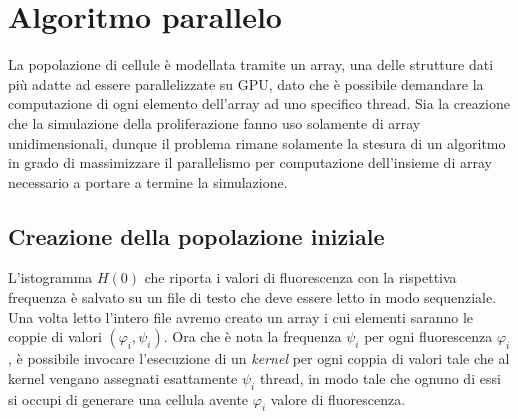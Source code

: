 \section{Algoritmo parallelo}

La popolazione di cellule è modellata tramite un array, una delle strutture
dati più adatte ad essere parallelizzate su GPU, dato che è possibile
demandare la computazione di ogni elemento dell'array ad uno specifico thread.
Sia la creazione che la simulazione della proliferazione fanno uso solamente di
array unidimensionali, dunque il problema rimane solamente la stesura di un
algoritmo in grado di massimizzare il parallelismo per computazione
dell'insieme di array necessario a portare a termine la simulazione. 

\subsection{Creazione della popolazione iniziale}

L'istogramma $H(0)$ che riporta i valori di fluorescenza con la rispettiva
frequenza è salvato su un file di testo che deve essere letto in modo
sequenziale. Una volta letto l'intero file avremo creato un array i cui
elementi saranno le coppie di valori $(\varphi_{i}, \psi_{i})$.
Ora che è nota la frequenza $\psi_{i}$ per ogni fluorescenza $\varphi_{i}$,
è possibile invocare l'esecuzione di un \textit{kernel} per ogni coppia di
valori tale che al kernel vengano assegnati esattamente $\psi_{i}$ thread,
in modo tale che ognuno di essi si occupi di generare una cellula avente $\varphi_{i}$
valore di fluorescenza.
\\
\begin{figure}[H]
    \centering
    \caption{}
\end{figure}

